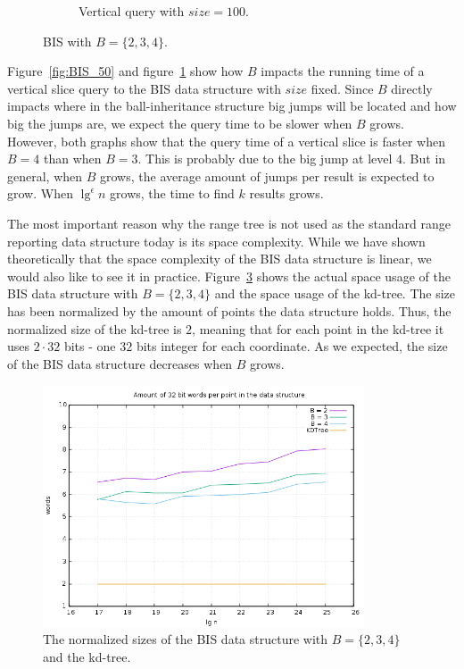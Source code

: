 \begin{figure}[h]
{\begin{subfigure}[b]{0.68\textwidth}
        \caption{Vertical query with $size = 100$.}
        \label{fig:BIS_100}
    \end{subfigure}
  }
  \caption{BIS with $B = \{2,3,4\}$.}
  \label{fig:comparing_BIS}
  
\end{figure}

Figure~\ref{fig:BIS_50} and figure~\ref{fig:BIS_100} show how $B$ impacts the running time of a vertical slice query to the BIS data structure with $size$ fixed. Since $B$ directly impacts where in the ball-inheritance structure big jumps will be located and how big the jumps are, we expect the query time to be slower when $B$ grows. However, both graphs show that the query time of a vertical slice is faster when $B = 4$ than when $B = 3$. This is probably due to the big jump at level $4$. But in general, when $B$ grows, the average amount of jumps per result is expected to grow. When $\lg^\epsilon n$ grows, the time to find $k$ results grows.

The most important reason why the range tree is not used as the standard range reporting data structure today is its space complexity. While we have shown theoretically that the space complexity of the BIS data structure is linear, we would also like to see it in practice. Figure~\ref{fig:sizes} shows the actual space usage of the BIS data structure with $B=\{2,3,4\}$ and the space usage of the kd-tree. The size has been normalized by the amount of points the data structure holds. Thus, the normalized size of the kd-tree is $2$, meaning that for each point in the kd-tree it uses $2\cdot 32$ bits - one $32$ bits integer for each coordinate. As we expected, the size of the BIS data structure decreases when $B$ grows.

\begin{figure}[h]
    \centering
    \includegraphics[width = 0.85\textwidth]{pictures/analysis/sizes.png}
    \caption{The normalized sizes of the BIS data structure with $B=\{2,3,4\}$ and the kd-tree.}\label{fig:sizes}
\end{figure}
\clearpage


